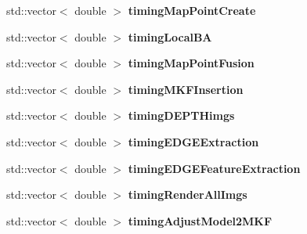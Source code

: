 \begin{DoxyCompactItemize}
\item 
std\+::vector$<$ double $>$ {\bfseries timing\+Map\+Point\+Create}\hypertarget{classMultiColSLAM_1_1cLocalMapping_a997934bb76d8aa5f4ddd03e94423da3f}{}\label{classMultiColSLAM_1_1cLocalMapping_a997934bb76d8aa5f4ddd03e94423da3f}

\item 
std\+::vector$<$ double $>$ {\bfseries timing\+Local\+BA}\hypertarget{classMultiColSLAM_1_1cLocalMapping_a9063c17b575aab5e7066721e0ba43300}{}\label{classMultiColSLAM_1_1cLocalMapping_a9063c17b575aab5e7066721e0ba43300}

\item 
std\+::vector$<$ double $>$ {\bfseries timing\+Map\+Point\+Fusion}\hypertarget{classMultiColSLAM_1_1cLocalMapping_a5bb70e938a065270f25eddb3c25b686e}{}\label{classMultiColSLAM_1_1cLocalMapping_a5bb70e938a065270f25eddb3c25b686e}

\item 
std\+::vector$<$ double $>$ {\bfseries timing\+M\+K\+F\+Insertion}\hypertarget{classMultiColSLAM_1_1cLocalMapping_a02e828a273111a06ff13d8bc5bc6da9f}{}\label{classMultiColSLAM_1_1cLocalMapping_a02e828a273111a06ff13d8bc5bc6da9f}

\item 
std\+::vector$<$ double $>$ {\bfseries timing\+D\+E\+P\+T\+Himgs}\hypertarget{classMultiColSLAM_1_1cLocalMapping_ac2a3a871b4c0dcc610ff984f70ce0314}{}\label{classMultiColSLAM_1_1cLocalMapping_ac2a3a871b4c0dcc610ff984f70ce0314}

\item 
std\+::vector$<$ double $>$ {\bfseries timing\+E\+D\+G\+E\+Extraction}\hypertarget{classMultiColSLAM_1_1cLocalMapping_a14e4b670471a7bfebc898c5e716c2a7e}{}\label{classMultiColSLAM_1_1cLocalMapping_a14e4b670471a7bfebc898c5e716c2a7e}

\item 
std\+::vector$<$ double $>$ {\bfseries timing\+E\+D\+G\+E\+Feature\+Extraction}\hypertarget{classMultiColSLAM_1_1cLocalMapping_a30034de4891ea33683f1c70c66bb8ab9}{}\label{classMultiColSLAM_1_1cLocalMapping_a30034de4891ea33683f1c70c66bb8ab9}

\item 
std\+::vector$<$ double $>$ {\bfseries timing\+Render\+All\+Imgs}\hypertarget{classMultiColSLAM_1_1cLocalMapping_a592945d0aa3a604f2eb52a63cd597c3f}{}\label{classMultiColSLAM_1_1cLocalMapping_a592945d0aa3a604f2eb52a63cd597c3f}

\item 
std\+::vector$<$ double $>$ {\bfseries timing\+Adjust\+Model2\+M\+KF}\hypertarget{classMultiColSLAM_1_1cLocalMapping_a4e1b43ab20ca5f372371b33eedba4858}{}\label{classMultiColSLAM_1_1cLocalMapping_a4e1b43ab20ca5f372371b33eedba4858}

\end{DoxyCompactItemize}
